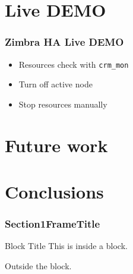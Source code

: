 \documentclass[10pt]{beamer}
\begin{document}
\section {Live DEMO}

\begin{frame}

\frametitle{Zimbra HA Live DEMO}


\begin{center}
  \begin{itemize}
    \item Resources check with {\tt crm\_mon}
    \item Turn off active node
    \item Stop resources manually
  \end{itemize}
\end{center}




\end{frame}
\section {Future work}
\section {Conclusions}





\begin{frame}[fragile]
\frametitle{Section1FrameTitle}

\begin{block}{Block Title}
This is inside a block.


\end{block}

Outside the block.

\end{frame}
\end{document}

